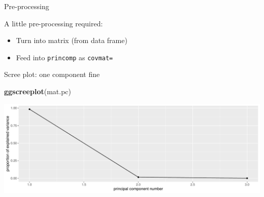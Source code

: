 \documentclass[
  ignorenonframetext,
]{beamer}
\newenvironment{Shaded}{\begin{snugshade}}{\end{snugshade}}
\newcommand{\DataTypeTok}[1]{\textcolor[rgb]{0.13,0.29,0.53}{#1}}
\newcommand{\KeywordTok}[1]{\textcolor[rgb]{0.13,0.29,0.53}{\textbf{#1}}}
\newcommand{\NormalTok}[1]{#1}
\newcommand{\OperatorTok}[1]{\textcolor[rgb]{0.81,0.36,0.00}{\textbf{#1}}}
\newcommand{\StringTok}[1]{\textcolor[rgb]{0.31,0.60,0.02}{#1}}
\begin{document}
\begin{frame}[fragile]{Pre-processing}
\protect\hypertarget{pre-processing}{}

A little pre-processing required:

\begin{itemize}
\item
  Turn into matrix (from data frame)
\item
  Feed into \texttt{princomp} as \texttt{covmat=}
\end{itemize}

\begin{Shaded}
\end{Shaded}

\end{frame}

\begin{frame}[fragile]{Scree plot: one component fine}
\protect\hypertarget{scree-plot-one-component-fine}{}

\begin{Shaded}
\begin{Highlighting}[]
\KeywordTok{ggscreeplot}\NormalTok{(mat.pc)}
\end{Highlighting}
\end{Shaded}

\includegraphics{slides_d29_files/figure-beamer/palermo-1.pdf}

\end{frame}
\end{document}
